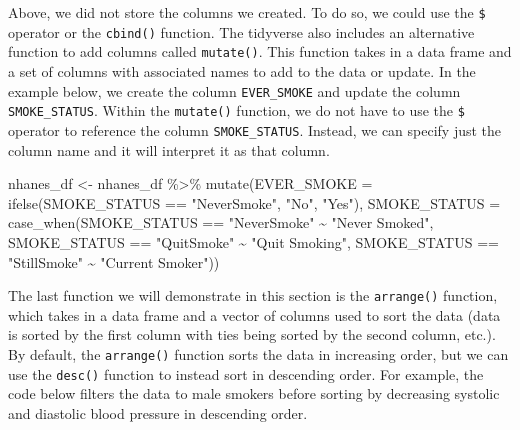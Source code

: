 \documentclass[
  letterpaper,
]{krantz}
\makeatletter
\newenvironment{Shaded}{\begin{snugshade}}{\end{snugshade}}
\newcommand{\AttributeTok}[1]{\textcolor[rgb]{0.40,0.45,0.13}{#1}}
\newcommand{\FunctionTok}[1]{\textcolor[rgb]{0.28,0.35,0.67}{#1}}
\newcommand{\NormalTok}[1]{\textcolor[rgb]{0.00,0.23,0.31}{#1}}
\newcommand{\OtherTok}[1]{\textcolor[rgb]{0.00,0.23,0.31}{#1}}
\newcommand{\SpecialCharTok}[1]{\textcolor[rgb]{0.37,0.37,0.37}{#1}}
\newcommand{\StringTok}[1]{\textcolor[rgb]{0.13,0.47,0.30}{#1}}
\newenvironment{kframe}{%
\medskip{}
\setlength{\fboxsep}{.8em}
 \def\at@end@of@kframe{}%
 \ifinner\ifhmode%
  \def\at@end@of@kframe{\end{minipage}}%
  \begin{minipage}{\columnwidth}%
 \fi\fi%
 \def\FrameCommand##1{\hskip\@totalleftmargin \hskip-\fboxsep
 \colorbox{shadecolor}{##1}\hskip-\fboxsep
     \hskip-\linewidth \hskip-\@totalleftmargin \hskip\columnwidth}%
 \MakeFramed {\advance\hsize-\width
   \@totalleftmargin\z@ \linewidth\hsize
   \@setminipage}}%
 {\par\unskip\endMakeFramed%
 \at@end@of@kframe}
\renewenvironment{Shaded}{\begin{kframe}}{\end{kframe}}
\makeatother
\begin{document}
Above, we did not store the columns we created. To do so, we could use
the \texttt{\$} operator or the \texttt{cbind()} function. The tidyverse
also includes an alternative function to add columns called
\texttt{mutate()}. This function takes in a data frame and a set of
columns with associated names to add to the data or update. In the
example below, we create the column \texttt{EVER\_SMOKE} and update the
column \texttt{SMOKE\_STATUS}. Within the \texttt{mutate()} function, we
do not have to use the \texttt{\$} operator to reference the column
\texttt{SMOKE\_STATUS}. Instead, we can specify just the column name and
it will interpret it as that column.

\begin{Shaded}
\begin{Highlighting}[]
\NormalTok{nhanes\_df }\OtherTok{\textless{}{-}}\NormalTok{ nhanes\_df }\SpecialCharTok{\%\textgreater{}\%} 
  \FunctionTok{mutate}\NormalTok{(}\AttributeTok{EVER\_SMOKE =} \FunctionTok{ifelse}\NormalTok{(SMOKE\_STATUS }\SpecialCharTok{==} \StringTok{"NeverSmoke"}\NormalTok{, }
                             \StringTok{"No"}\NormalTok{, }\StringTok{"Yes"}\NormalTok{), }
         \AttributeTok{SMOKE\_STATUS =} 
           \FunctionTok{case\_when}\NormalTok{(SMOKE\_STATUS }\SpecialCharTok{==} \StringTok{"NeverSmoke"} \SpecialCharTok{\textasciitilde{}} \StringTok{"Never Smoked"}\NormalTok{,}
\NormalTok{                     SMOKE\_STATUS }\SpecialCharTok{==} \StringTok{"QuitSmoke"} \SpecialCharTok{\textasciitilde{}} \StringTok{"Quit Smoking"}\NormalTok{,}
\NormalTok{                     SMOKE\_STATUS }\SpecialCharTok{==} \StringTok{"StillSmoke"} \SpecialCharTok{\textasciitilde{}} \StringTok{"Current Smoker"}\NormalTok{)) }
\end{Highlighting}
\end{Shaded}

The last function we will demonstrate in this section is the
\texttt{arrange()} function, which takes in a data frame and a vector of
columns used to sort the data (data is sorted by the first column with
ties being sorted by the second column, etc.). By default, the
\texttt{arrange()} function sorts the data in increasing order, but we
can use the \texttt{desc()} function to instead sort in descending
order. For example, the code below filters the data to male smokers
before sorting by decreasing systolic and diastolic blood pressure in
descending order.
\end{document}

